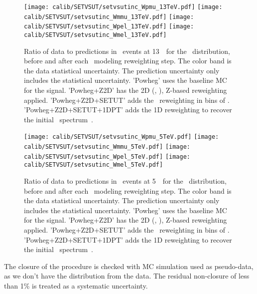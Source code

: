      
     \begin{figure}[pt]
     	\texttt{[image: calib/SETVSUT/setvsutinc\_Wpmu\_13TeV.pdf]}%
     	\texttt{[image: calib/SETVSUT/setvsutinc\_Wmmu\_13TeV.pdf]}
		\texttt{[image: calib/SETVSUT/setvsutinc\_Wpel\_13TeV.pdf]}%
     	\texttt{[image: calib/SETVSUT/setvsutinc\_Wmel\_13TeV.pdf]}
     	\caption{Ratio of data to predictions in
     		\Wmn\ events at 13~\TeV\ for the \setue\ distribution, before and after each \setue\ modeling reweighting step. The color band is the data statistical uncertainty. The prediction uncertainty only includes the statistical uncertainty. 'Powheg' uses the baseline MC for the signal. 'Powheg+Z2D' has the 2D (\setue, \pttruthv), Z-based reweighting applied. 'Powheg+Z2D+SETUT' adds the \setue\ reweighting in bins of \ut. 'Powheg+Z2D+SETUT+1DPT' adds the 1D reweighting to recover the initial \pttruthv\ spectrum~\cite{int_note_hr}.}
     	\label{fig:setCalibDataMCRatio13}
     \end{figure}
     
     
     \begin{figure}[pt]
     	\texttt{[image: calib/SETVSUT/setvsutinc\_Wpmu\_5TeV.pdf]}%
		\texttt{[image: calib/SETVSUT/setvsutinc\_Wmmu\_5TeV.pdf]}
		\texttt{[image: calib/SETVSUT/setvsutinc\_Wpel\_5TeV.pdf]}%
		\texttt{[image: calib/SETVSUT/setvsutinc\_Wmel\_5TeV.pdf]}
     	\caption{Ratio of data to predictions in
     		\Wmn\ events at 5~\TeV\ for the \setue\ distribution, before and after each \setue\ modeling reweighting step. The color band is the data statistical uncertainty. The prediction uncertainty only includes the statistical uncertainty. 'Powheg' uses the baseline MC for the signal. 'Powheg+Z2D' has the 2D (\setue, \pttruthv), Z-based reweighting applied. 'Powheg+Z2D+SETUT' adds the \setue\ reweighting in bins of \ut. 'Powheg+Z2D+SETUT+1DPT' adds the 1D reweighting to recover the initial \pttruthv\ spectrum~\cite{int_note_hr}.}
     	\label{fig:setCalibDataMCRatio5}
     \end{figure}
     
     The closure of the procedure is checked with \Sherpa MC simulation used as pseudo-data, as we don't have the \ptv distribution from the data. The residual non-closure of less than 1\% is treated as a systematic uncertainty.
